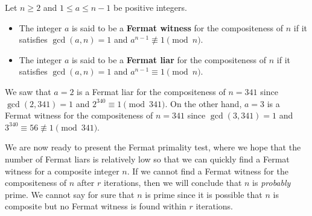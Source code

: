\begin{defn}
Let $n \geq 2$ and $1 \leq a \leq n-1$ be positive integers.
\begin{itemize}
    \item The integer $a$ is said to be a {\bf Fermat witness} for the compositeness of $n$ if it satisfies
    $\gcd(a, n) = 1$ and $a^{n-1} \not\equiv 1 \pmod n$. 
    \item The integer $a$ is said to be a {\bf Fermat liar} for the compositeness of $n$ if it satisfies 
    $\gcd(a, n) = 1$ and $a^{n-1} \equiv 1 \pmod n$. 
\end{itemize}
\end{defn}

We saw that $a = 2$ is a Fermat liar for the compositeness of $n = 341$ since $\gcd(2, 341) = 1$
and $2^{340} \equiv 1 \pmod{341}$. On the other hand, $a = 3$ is a Fermat witness for the compositeness
of $n = 341$ since $\gcd(3, 341) = 1$ and $3^{340} \equiv 56 \not\equiv 1 \pmod{341}$. 

We are now ready to present the Fermat primality test, where we hope that the number of Fermat liars 
is relatively low so that we can quickly find a Fermat witness for a composite integer $n$. 
If we cannot find a Fermat witness for the compositeness of $n$ after $r$ iterations, 
then we will conclude that $n$ is {\it probably} prime. We cannot say for sure that $n$ is prime 
since it is possible that $n$ is composite but no Fermat witness is found within $r$ iterations.

